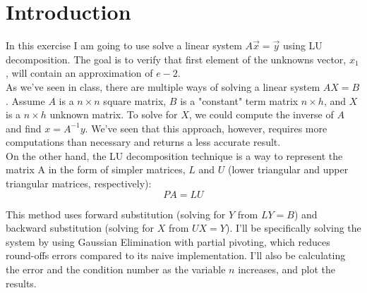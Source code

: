 \documentclass{article}
\begin{document}

\section{Introduction}\label{sec:intro}
In this exercise I am going to use solve a linear system $A\vec{x}=\vec{y}$ using LU decomposition. The goal is to verify that first element of the unknowns vector, $x_{1}$, will contain an approximation of $e - 2$.\\

As we've seen in class, there are multiple ways of solving a linear system $AX=B$. Assume $A$ is a $n\times n$ square matrix, $B$ is a "constant" term matrix $n\times h$, and $X$ is a $n\times h$ unknown matrix. To solve for $X$, we could compute the inverse of $A$ and find $x=A^{-1}y$. We've seen that this approach, however, requires more computations than necessary and returns a less accurate result.\\

On the other hand, the LU decomposition technique is a way to represent the matrix A in the form of simpler matrices, $L$ and $U$ (lower triangular and upper triangular matrices, respectively):
$$PA=LU$$

This method uses forward substitution (solving for $Y$ from $LY=B$) and backward substitution (solving for $X$ from $UX = Y$). I'll be specifically solving the system by using Gaussian Elimination with partial pivoting, which reduces round-offs errors compared to its naive implementation. I'll also be calculating the error and the condition number as the variable $n$ increases, and plot the results.
\end{document}
